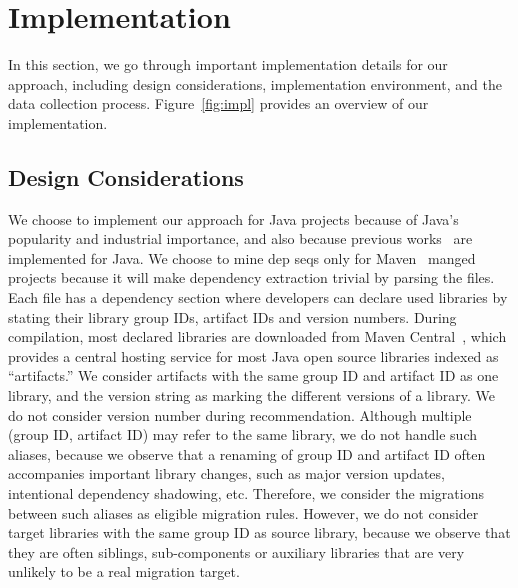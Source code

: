 \documentclass[conference, 10pt]{IEEEtran}
\begin{document}

\section{Implementation}
\label{sec:impl}

In this section, we go through important implementation details for our approach, including design considerations, implementation environment, and the data collection process. Figure~\ref{fig:impl} provides an overview of our implementation.

\subsection{Design Considerations}
\label{subsec:design-consideration}

We choose to implement our approach for Java projects because of Java's popularity and industrial importance, and also because previous works~\cite{2012WCRE-Teyton-Mining, 2014JournalOfSysAndSoft-Teyton-Study, 2019ICSME-Alrubaye-MigrationMiner} are implemented for Java. 
We choose to mine dep seqs only for Maven~\cite{Maven-Tool} manged projects because it will make dependency extraction trivial by parsing the  files. Each  file has a dependency section where developers can declare used libraries by stating their library group IDs, artifact IDs and version numbers. 
During compilation, most declared libraries are downloaded from Maven Central~\cite{Maven}, which provides a central hosting service for most Java open source libraries indexed as ``artifacts.'' 
We consider artifacts with the same group ID and artifact ID as one library, and the version string as marking the different versions of a library.
We do not consider version number during recommendation.
Although multiple (group ID, artifact ID) may refer to the same library, we do not handle such aliases, because we observe that a renaming of group ID and artifact ID often accompanies important library changes, such as major version updates, intentional dependency shadowing, etc.
Therefore, we consider the migrations between such aliases as eligible migration rules.
However, we do not consider target libraries with the same group ID as source library, %
because we observe that they are often siblings, sub-components or auxiliary libraries that are very unlikely to be a real migration target.
\end{document}

